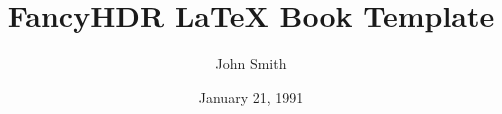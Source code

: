 \documentclass[a4paper,11pt]{book}
\begin{document}
\title{\textbf{FancyHDR LaTeX Book Template}}
\author{John Smith}
\date{January 21, 1991}


\maketitle






\tableofcontents



\pagestyle{fancy}







\nocite{*}


\end{document}
